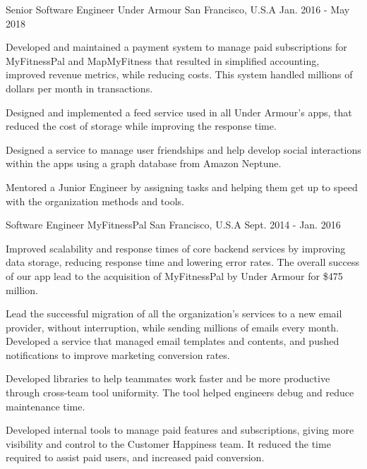 \begin{cventries}
  \cventry
    {Senior Software Engineer}
    {Under Armour}
    {San Francisco, U.S.A}
    {Jan. 2016 - May 2018}
    {
      \begin{cvitems}
	\item{Developed and maintained a payment system to manage paid subscriptions for MyFitnessPal and MapMyFitness that resulted in simplified accounting, improved revenue metrics, while reducing costs. This system handled millions of dollars per month in transactions. }
	\item {Designed and implemented a feed service used in all Under Armour's apps, that reduced the cost of storage while improving the response time.}
        \item {Designed a service to manage user friendships and help develop social interactions within the apps using a graph database from Amazon Neptune. }	
	\item {Mentored a Junior Engineer by assigning tasks and helping them get up to speed with the organization methods and tools.}
      \end{cvitems}
    }
    
  \cventry
    {Software Engineer}
    {MyFitnessPal}
    {San Francisco, U.S.A}
    {Sept. 2014 - Jan. 2016}
    {
      \begin{cvitems}	
        \item{Improved scalability and response times of core backend services by improving data storage, reducing response time and lowering error rates. The overall success of our app lead to the acquisition of MyFitnessPal by Under Armour for \$475 million.}
        \item {Lead the successful migration of all the organization's services to a new email provider, without interruption, while sending millions of emails every month. Developed a service that managed email templates and contents, and pushed notifications to improve marketing conversion rates.}
        \item {Developed libraries to help teammates work faster and be more productive through cross-team tool uniformity. The tool helped engineers debug and reduce maintenance time.}
        \item{Developed internal tools to manage paid features and subscriptions, giving more visibility and control to the Customer Happiness team. It reduced the time required to assist paid users, and increased paid conversion.}
      \end{cvitems}
    }



\end{cventries}
